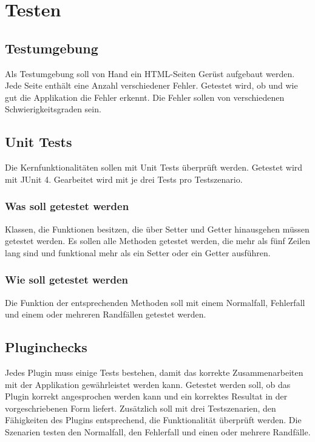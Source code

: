 \section{Testen}

\subsection{Testumgebung}
Als Testumgebung soll von Hand ein HTML-Seiten Gerüst aufgebaut werden. Jede Seite enthält eine Anzahl verschiedener Fehler. Getestet wird, ob und wie gut die Applikation die Fehler erkennt. Die Fehler sollen von verschiedenen Schwierigkeitsgraden sein.

\subsection{Unit Tests}
Die Kernfunktionalitäten sollen mit Unit Tests überprüft werden. Getestet wird mit JUnit 4. Gearbeitet wird mit je drei Tests pro Testszenario.

\subsubsection{Was soll getestet werden}
Klassen, die Funktionen besitzen, die über Setter und Getter hinausgehen müssen getestet werden. Es sollen alle Methoden getestet werden, die mehr als fünf Zeilen lang sind und funktional mehr als ein Setter oder ein Getter ausführen. 

\subsubsection{Wie soll getestet werden}
Die Funktion der entsprechenden Methoden soll mit einem Normalfall, Fehlerfall und einem oder mehreren Randfällen getestet werden.

\subsection{Pluginchecks}
Jedes Plugin muss einige Tests bestehen, damit das korrekte Zusammenarbeiten mit der Applikation gewährleistet werden kann. Getestet werden soll, ob das Plugin korrekt angesprochen werden kann und ein korrektes Resultat in der vorgeschriebenen Form liefert. Zusätzlich soll mit drei Testszenarien, den Fähigkeiten des Plugins entsprechend, die Funktionalität überprüft werden. Die Szenarien testen den Normalfall, den Fehlerfall und einen oder mehrere Randfälle.

